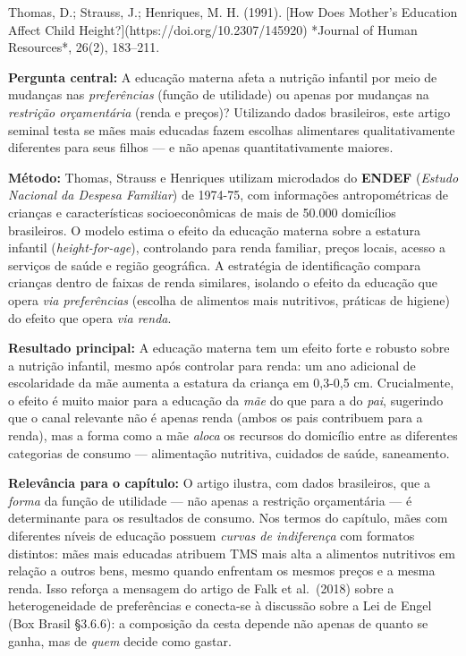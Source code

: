 \documentclass[11pt,twoside,openright]{book}
\begin{document}
\begin{pesquisabox}{Thomas, D.; Strauss, J.; Henriques, M. H. (1991). [How Does Mother's Education Affect Child Height?](https://doi.org/10.2307/145920) *Journal of Human Resources*, 26(2), 183–211.}

\textbf{Pergunta central:} A educação materna afeta a nutrição infantil
por meio de mudanças nas \emph{preferências} (função de utilidade) ou
apenas por mudanças na \emph{restrição orçamentária} (renda e preços)?
Utilizando dados brasileiros, este artigo seminal testa se mães mais
educadas fazem escolhas alimentares qualitativamente diferentes para
seus filhos --- e não apenas quantitativamente maiores.

\textbf{Método:} Thomas, Strauss e Henriques utilizam microdados do
\textbf{ENDEF} (\emph{Estudo Nacional da Despesa Familiar}) de 1974-75,
com informações antropométricas de crianças e características
socioeconômicas de mais de 50.000 domicílios brasileiros. O modelo
estima o efeito da educação materna sobre a estatura infantil
(\emph{height-for-age}), controlando para renda familiar, preços locais,
acesso a serviços de saúde e região geográfica. A estratégia de
identificação compara crianças dentro de faixas de renda similares,
isolando o efeito da educação que opera \emph{via preferências} (escolha
de alimentos mais nutritivos, práticas de higiene) do efeito que opera
\emph{via renda}.

\textbf{Resultado principal:} A educação materna tem um efeito forte e
robusto sobre a nutrição infantil, mesmo após controlar para renda: um
ano adicional de escolaridade da mãe aumenta a estatura da criança em
0,3-0,5 cm. Crucialmente, o efeito é muito maior para a educação da
\emph{mãe} do que para a do \emph{pai}, sugerindo que o canal relevante
não é apenas renda (ambos os pais contribuem para a renda), mas a forma
como a mãe \emph{aloca} os recursos do domicílio entre as diferentes
categorias de consumo --- alimentação nutritiva, cuidados de saúde,
saneamento.

\textbf{Relevância para o capítulo:} O artigo ilustra, com dados
brasileiros, que a \emph{forma} da função de utilidade --- não apenas a
restrição orçamentária --- é determinante para os resultados de consumo.
Nos termos do capítulo, mães com diferentes níveis de educação possuem
\emph{curvas de indiferença} com formatos distintos: mães mais educadas
atribuem TMS mais alta a alimentos nutritivos em relação a outros bens,
mesmo quando enfrentam os mesmos preços e a mesma renda. Isso reforça a
mensagem do artigo de Falk et al.~(2018) sobre a heterogeneidade de
preferências e conecta-se à discussão sobre a Lei de Engel (Box Brasil
§3.6.6): a composição da cesta depende não apenas de quanto se ganha,
mas de \emph{quem} decide como gastar.

\end{pesquisabox}
\end{document}
